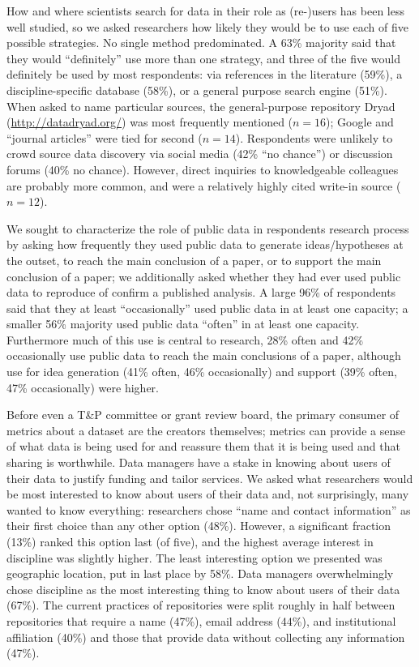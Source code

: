 \documentclass[english]{article}
\begin{document}
How and where scientists search for data in their role as (re-)users has been less well studied, so we asked researchers how likely they would be to use each of five possible strategies.
No single method predominated.
A 63\% majority said that they would ``definitely'' use more than one strategy, and three of the five would definitely be used by most respondents: via references in the literature (59\%), a discipline-specific database (58\%), or a general purpose search engine (51\%). 
When asked to name particular sources, the general-purpose repository Dryad (\url{http://datadryad.org/}) was most frequently mentioned ($n=16$); Google and ``journal articles'' were tied for second ($n=14$). 
Respondents were unlikely to crowd source data discovery via social media (42\% ``no chance'') or discussion forums (40\% no chance).
However, direct inquiries to knowledgeable colleagues are probably more common, and were a relatively highly cited write-in source ($n=12$).

We sought to characterize the role of public data in respondents research process by asking how frequently they used public data to generate ideas/hypotheses at the outset, to reach the main conclusion of a paper, or to support the main conclusion of a paper; we additionally asked whether they had ever used public data to reproduce of confirm a published analysis.
A large 96\% of respondents said that they at least ``occasionally'' used public data in at least one capacity; a smaller 56\% majority used public data ``often'' in at least one capacity.
Furthermore much of this use is central to research, 28\% often and 42\% occasionally use public data to reach the main conclusions of a paper, although use for idea generation (41\% often, 46\% occasionally) and support (39\% often, 47\% occasionally) were higher.



Before even a T\&P committee or grant review board, the primary consumer of metrics about a dataset are the creators themselves; metrics can provide a sense of what data is being used for and reassure them that it is being used and that sharing is worthwhile.
Data managers have a stake in knowing about users of their data to justify funding and tailor services.
We asked what researchers would be most interested to know about users of their data and, not surprisingly, many wanted to know everything: researchers chose ``name and contact information'' as their first choice than any other option (48\%).
However, a significant fraction (13\%) ranked this option last (of five), and the highest average interest in discipline was slightly higher.
The least interesting option we presented was geographic location, put in last place by 58\%.
Data managers overwhelmingly chose discipline as the most interesting thing to know about users of their data (67\%).
The current practices of repositories were split roughly in half between repositories that require a name (47\%), email address (44\%), and institutional affiliation (40\%) and those that provide data without collecting any information (47\%).
\end{document}
